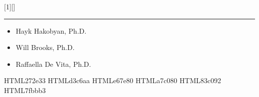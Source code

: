 [1][]
{
    \vspace{21pt}

    \begin{center}
        \textbf{\inserttitle}\par
        \insertauthor\par

        \vspace{24pt}

        \noindent\rule{2cm}{0.8pt}
    \end{center}

    \vspace{24pt}

    \begin{itemize}
        \item[]
            Hayk Hakobyan, Ph.D.

        \item[]
            Will Brooks, Ph.D.

        \item[]
            Raffaella De Vita, Ph.D.
    \end{itemize}

    \begin{flushright}
        \insertdate\par
    \end{flushright}

    \vfill
}

\definecolor{efd_bg}    {HTML}{272e33}
\definecolor{efd_fg}    {HTML}{d3c6aa}
\definecolor{efd_red}   {HTML}{e67e80}
\definecolor{efd_green} {HTML}{a7c080}
\definecolor{efd_aqua}  {HTML}{83c092}
\definecolor{efd_blue}  {HTML}{7fbbb3}

\newcommand{\ef}[1]{\textbf{\textcolor{color_ef}{#1}}}
\newcommand{\eft}[1]{\texttt{\ef{#1}}}
\newcommand{\ered}   [1]{\textbf{\textcolor{efd_red}   {#1}}}
\newcommand{\eorange}[1]{\textbf{\textcolor{efd_orange}{#1}}}
\newcommand{\eyellow}[1]{\textbf{\textcolor{efd_yellow}{#1}}}
\newcommand{\egreen} [1]{\textbf{\textcolor{efd_green} {#1}}}
\newcommand{\eaqua}  [1]{\textbf{\textcolor{efd_aqua}  {#1}}}
\newcommand{\eblue}  [1]{\textbf{\textcolor{efd_blue}  {#1}}}
\newcommand{\epurple}[1]{\textbf{\textcolor{efd_purple}{#1}}}

